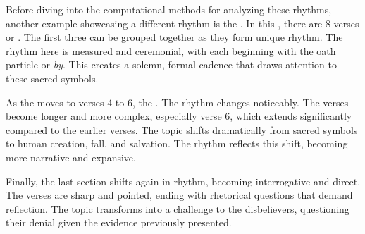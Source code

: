 Before diving into the computational methods for analyzing these rhythms, another example showcasing a different rhythm is the  . In this  , there are 8 verses or  . The first three can be grouped together as they form unique rhythm. The rhythm here is measured and ceremonial, with each   beginning with the oath particle   or \textit{by}. This creates a solemn, formal cadence that draws attention to these sacred symbols. 

As the   moves to verses 4 to 6, the  . The rhythm changes noticeably. The verses become longer and more complex, especially verse 6, which extends significantly compared to the earlier verses. The topic shifts dramatically from sacred symbols to human creation, fall, and salvation. The rhythm reflects this shift, becoming more narrative and expansive.

Finally, the last section shifts again in rhythm, becoming interrogative and direct. The verses are sharp and pointed, ending with rhetorical questions that demand reflection. The topic transforms into a challenge to the disbelievers, questioning their denial given the evidence previously presented.

